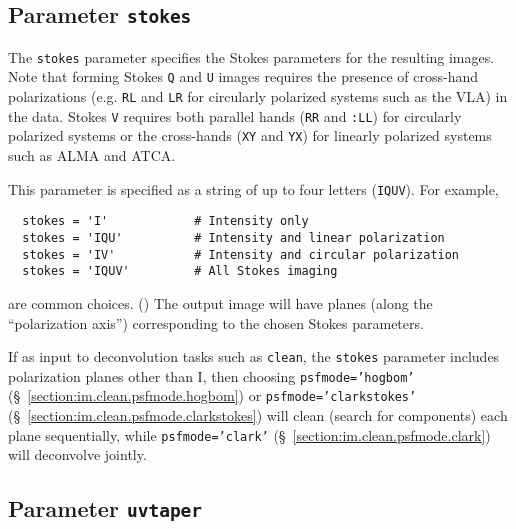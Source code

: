 \subsection{Parameter {\tt stokes} }
\label{section:im.pars.stokes}

The {\tt stokes} parameter specifies the Stokes parameters for the
resulting images.  Note that forming Stokes {\tt Q} and {\tt U} images
requires the presence of
cross-hand polarizations (e.g. {\tt RL} and {\tt LR} for circularly
polarized systems such as the VLA) in the data.  
Stokes {\tt V} requires both parallel
hands ({\tt RR} and {\tt :LL}) for circularly polarized systems or
the cross-hands ({\tt XY} and {\tt YX}) for linearly polarized systems
such as ALMA and ATCA.

This parameter is specified as a string of up to four letters ({\tt IQUV}).
For example,
\small
\begin{verbatim}
  stokes = 'I'            # Intensity only
  stokes = 'IQU'          # Intensity and linear polarization
  stokes = 'IV'           # Intensity and circular polarization
  stokes = 'IQUV'         # All Stokes imaging
\end{verbatim}
\normalsize
are common choices. ()
The output image will have planes (along the ``polarization axis'')
corresponding to the chosen Stokes parameters.  

If as input to deconvolution tasks such as {\tt clean}, the {\tt stokes} parameter
includes polarization planes other than I, then choosing {\tt psfmode='hogbom'} 
(\S~\ref{section:im.clean.psfmode.hogbom}) or {\tt psfmode='clarkstokes'} 
(\S~\ref{section:im.clean.psfmode.clarkstokes}) will clean (search for
components) each plane sequentially, while {\tt psfmode='clark'} 
(\S~\ref{section:im.clean.psfmode.clark}) will deconvolve jointly.


\subsection{Parameter {\tt uvtaper} }
\label{section:im.pars.uvtaper}

